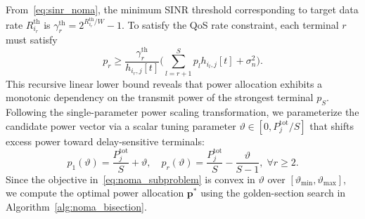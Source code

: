 \documentclass[journal]{IEEEtran}
\begin{document}
From~\eqref{eq:sinr_noma}, the minimum SINR threshold corresponding to target data rate $R_{i_r}^{\mathrm{th}}$ is $\gamma_r^{\mathrm{th}} = 2^{R_{i_r}^{\mathrm{th}}/W} - 1$. To satisfy the QoS rate constraint, each terminal $r$ must satisfy
\begin{equation}
    p_r \ge \frac{\gamma_r^{\mathrm{th}}}{h_{i_r, j}[t]} \Biggl(\sum_{l=r+1}^S p_l h_{i_l, j}[t] + \sigma_n^2\Biggr).
    \label{eq:power_lower_bound}
\end{equation}
This recursive linear lower bound reveals that power allocation exhibits a monotonic dependency on the transmit power of the strongest terminal $p_S$. Following the single-parameter power scaling transformation, we parameterize the candidate power vector via a scalar tuning parameter $\vartheta \in [0, P_j^{\mathrm{tot}}/S]$ that shifts excess power toward delay-sensitive terminals:
\begin{equation}
    p_1(\vartheta) = \frac{P_j^{\mathrm{tot}}}{S} + \vartheta, \quad p_r(\vartheta) = \frac{P_j^{\mathrm{tot}}}{S} - \frac{\vartheta}{S - 1}, \; \forall r \ge 2.
    \label{eq:param_power}
\end{equation}
Since the objective in~\eqref{eq:noma_subproblem} is convex in $\vartheta$ over $[\vartheta_{\min}, \vartheta_{\max}]$, we compute the optimal power allocation $\mathbf{p}^*$ using the golden-section search in Algorithm~\ref{alg:noma_bisection}.
\end{document}
